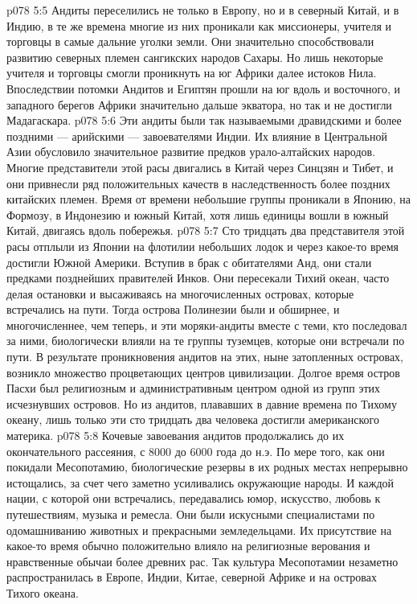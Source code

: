 \vs p078 5:5 \pc Андиты переселились не только в Европу, но и в северный Китай, и в Индию, в те же времена многие из них проникали как миссионеры, учителя и торговцы в самые дальние уголки земли. Они значительно способствовали развитию северных племен сангикских народов Сахары. Но лишь некоторые учителя и торговцы смогли проникнуть на юг Африки далее истоков Нила. Впоследствии потомки Андитов и Египтян прошли на юг вдоль и восточного, и западного берегов Африки значительно дальше экватора, но так и не достигли Мадагаскара.
\vs p078 5:6 Эти андиты были так называемыми дравидскими и более поздними --- арийскими --- завоевателями Индии. Их влияние в Центральной Азии обусловило значительное развитие предков урало\hyp{}алтайских народов. Многие представители этой расы двигались в Китай через Синцзян и Тибет, и они привнесли ряд положительных качеств в наследственность более поздних китайских племен. Время от времени небольшие группы проникали в Японию, на Формозу, в Индонезию и южный Китай, хотя лишь единицы вошли в южный Китай, двигаясь вдоль побережья.
\vs p078 5:7 Сто тридцать два представителя этой расы отплыли из Японии на флотилии небольших лодок и через какое\hyp{}то время достигли Южной Америки. Вступив в брак с обитателями Анд, они стали предками позднейших правителей Инков. Они пересекали Тихий океан, часто делая остановки и высаживаясь на многочисленных островах, которые встречались на пути. Тогда острова Полинезии были и обширнее, и многочисленнее, чем теперь, и эти моряки\hyp{}андиты вместе с теми, кто последовал за ними, биологически влияли на те группы туземцев, которые они встречали по пути. В результате проникновения андитов на этих, ныне затопленных островах, возникло множество процветающих центров цивилизации. Долгое время остров Пасхи был религиозным и административным центром одной из групп этих исчезнувших островов. Но из андитов, плававших в давние времена по Тихому океану, лишь только эти сто тридцать два человека достигли американского материка.
\vs p078 5:8 \pc Кочевые завоевания андитов продолжались до их окончательного рассеяния, с 8000 до 6000 года до н.э. По мере того, как они покидали Месопотамию, биологические резервы в их родных местах непрерывно истощались, за счет чего заметно усиливались окружающие народы. И каждой нации, с которой они встречались, передавались юмор, искусство, любовь к путешествиям, музыка и ремесла. Они были искусными специалистами по одомашниванию животных и прекрасными земледельцами. Их присутствие на какое\hyp{}то время обычно положительно влияло на религиозные верования и нравственные обычаи более древних рас. Так культура Месопотамии незаметно распространилась в Европе, Индии, Китае, северной Африке и на островах Тихого океана.

